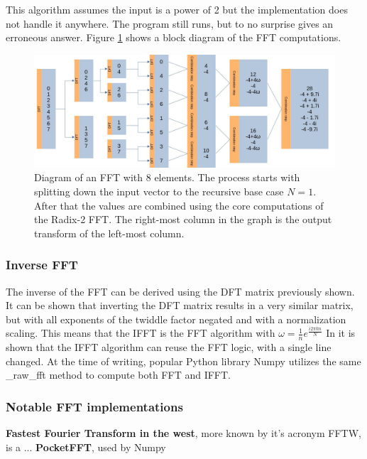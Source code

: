 


This algorithm assumes the input is a power of 2 but the implementation does not handle it anywhere. The program still runs, but to no surprise gives an erroneous answer. Figure \ref{fig:FFT-Alg} shows a block diagram of the FFT computations.

\begin{figure}[ht]
    \centering
    \includegraphics[width=\textwidth]{./images/fft.jpg}
    \caption{Diagram of an FFT with 8 elements. The process starts with splitting down the input vector to the recursive base case $N=1$. After that the values are combined using the core computations of the Radix-2 FFT. The right-most column in the graph is the output transform of the left-most column.\label{fig:FFT-Alg}}
\end{figure}


\subsubsection{Inverse FFT}
The inverse of the FFT can be derived using the DFT matrix previously shown. It can be shown that inverting the DFT matrix results in a very similar matrix, but with all exponents of the twiddle factor negated and with a normalization scaling. This means that the IFFT is the FFT algorithm with $\omega = \frac{1}{n}e^{\frac{i2\pi kn}{N}}$ In \cite{Reducible2020} it is shown that the IFFT algorithm can reuse the FFT logic, with a single line changed. At the time of writing, popular Python library Numpy utilizes the same \_raw\_fft method to compute both FFT and IFFT.  

\subsubsection{Notable FFT implementations}
\textbf{Fastest Fourier Transform in the west}, more known by it's acronym FFTW, is a ...
\textbf{PocketFFT}, used by Numpy






